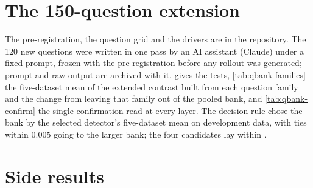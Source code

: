 \FloatBarrier
\section{The 150-question extension}
\label{app:qbank}

The pre-registration, the question grid and the drivers are in the repository. The 120 new questions were
written in one pass by an AI assistant (Claude) under a fixed prompt, frozen with the pre-registration
before any rollout was generated; prompt and raw output are archived with it. 
gives the tests, \cref{tab:qbank-families} the five-dataset mean of the extended contrast built from each
question family and the change from leaving that family out of the pooled bank, and
\cref{tab:qbank-confirm} the single confirmation read at every layer. The decision rule chose the bank by
the selected detector's five-dataset mean on development data, with ties within 0.005 going to the larger
bank; the four candidates lay within .

\begin{table}[h]
\centering
\footnotesize
\caption{The pre-registered tests of the question extension (Llama, layer 40).}
\label{tab:qbank-tests}
\resizebox{\linewidth}{!}{}
\end{table}

\begin{table}[h]
\centering
\footnotesize
\caption{The extended contrast built from each question family, five-dataset mean at layer 40.}
\label{tab:qbank-families}

\end{table}

\begin{table}[h]
\centering
\footnotesize
\caption{The confirmation read: the 150-question bank against the 30-question bank, paired.}
\label{tab:qbank-confirm}
\resizebox{\linewidth}{!}{}
\end{table}

\FloatBarrier
\section{Side results}
\label{app:side}

